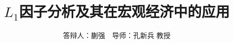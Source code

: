 \documentclass{beamer}
\begin{document}
\title{$L_1$因子分析及其在宏观经济中的应用} 
\author{答辩人：蒯强\ \ 导师：孔新兵 教授}

\frame{\titlepage}








\end{document}

